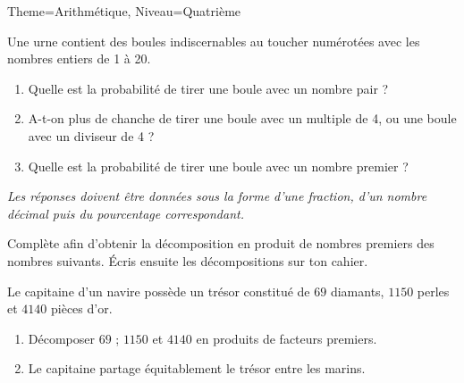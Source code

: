 \documentclass[11pt]{article}
\begin{document}
\begin{multicols}{2}
\begin{Maquette}[Fiche]{Theme=Arithmétique, Niveau=Quatrième}
\begin{exercice}
    Une urne contient des boules indiscernables au toucher numérotées avec les nombres entiers de 1 à 20.
    \begin{center}
        \SchemaProba[%
        ListeNombres={1,2,3,4,5,6,7,8,9,10,11,12,13,14,15,16,17,18,19,20},
        Echelle=0.75,
        Pas=6,
        Repartition={1,1,1,1,1,1,1,1,1,1,1,1,1,1,1,1,1,1,1,1}]
    \end{center}
    \begin{enumerate}
        \item Quelle est la probabilité de tirer une boule avec un nombre pair ?
        \item A-t-on plus de chanche de tirer une boule avec un multiple de 4, ou une boule avec un diviseur de 4 ?
        \item Quelle est la probabilité de tirer une boule avec un nombre premier ?
    \end{enumerate}
    \emph{Les réponses doivent être données sous la forme d’une fraction, d’un nombre décimal puis du pourcentage correspondant.}
\end{exercice}

\columnbreak

\begin{exercice}
    Complète afin d’obtenir la décomposition en produit de nombres premiers des nombres suivants. Écris ensuite les décompositions sur ton cahier.
    \begin{multicols}{3}
    \end{multicols}
    \begin{multicols}{3}
    \end{multicols}
\end{exercice}

\begin{exercice}
    Le capitaine d'un navire possède un trésor constitué de $69$ diamants, $1150$ perles et $4140$ pièces d'or.

    \smallskip

    \begin{enumerate}
    \item Décomposer $69$ ; $1150$ et $4140$ en produits de facteurs premiers.
    \item Le capitaine partage équitablement le trésor entre les marins.


\end{enumerate}
\end{exercice}
\end{Maquette}
\end{multicols}
\end{document}

